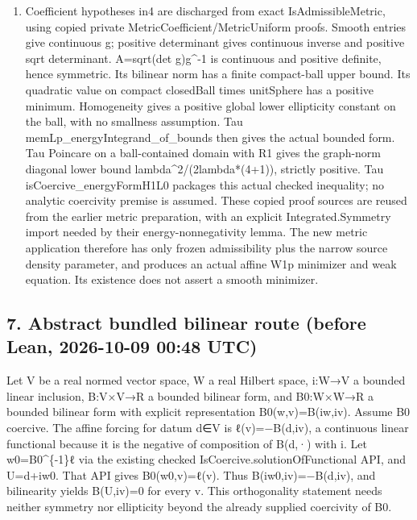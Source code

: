 \documentclass[11pt]{article}
\theoremstyle{definition}
\theoremstyle{remark}
\numberwithin{equation}{section}
\providecommand{\tightlist}{}
\begin{document}
\begin{enumerate}
\def\labelenumi{\arabic{enumi}.}
\setcounter{enumi}{5}
\tightlist
\item
  Coefficient hypotheses in4 are discharged from exact
  IsAdmissibleMetric, using copied private
  MetricCoefficient/MetricUniform proofs. Smooth entries give continuous
  g; positive determinant gives continuous inverse and positive sqrt
  determinant. A=sqrt(det g)g\^{}-1 is continuous and positive definite,
  hence symmetric. Its bilinear norm has a finite compact-ball upper
  bound. Its quadratic value on compact closedBall times unitSphere has
  a positive minimum. Homogeneity gives a positive global lower
  ellipticity constant on the ball, with no smallness assumption. Tau
  memLp\_energyIntegrand\_of\_bounds then gives the actual bounded form.
  Tau Poincare on a ball-contained domain with R1 gives the graph-norm
  diagonal lower bound lambda\^{}2/(2lambda*(4+1)), strictly positive.
  Tau isCoercive\_energyFormH1L0 packages this actual checked
  inequality; no analytic coercivity premise is assumed. These copied
  proof sources are reused from the earlier metric preparation, with an
  explicit Integrated.Symmetry import needed by their
  energy-nonnegativity lemma. The new metric application therefore has
  only frozen admissibility plus the narrow source density parameter,
  and produces an actual affine W1p minimizer and weak equation. Its
  existence does not assert a smooth minimizer.
\end{enumerate}

\hypertarget{source-1efa4a952efe-abstract-bundled-bilinear-route-before-lean-2026-10-09-0048-utc}{%
\subsection{7. Abstract bundled bilinear route (before Lean, 2026-10-09
00:48
UTC)}\label{source-1efa4a952efe-abstract-bundled-bilinear-route-before-lean-2026-10-09-0048-utc}}

Let V be a real normed vector space, W a real Hilbert space, i:W→V a
bounded linear inclusion, B:V×V→R a bounded bilinear form, and B0:W×W→R
a bounded bilinear form with explicit representation B0(w,v)=B(iw,iv).
Assume B0 coercive. The affine forcing for datum d∈V is ℓ(v)=−B(d,iv), a
continuous linear functional because it is the negative of composition
of B(d,·) with i. Let w0=B0\^{}\{-1\}ℓ via the existing checked
IsCoercive.solutionOfFunctional API, and U=d+iw0. That API gives
B0(w0,v)=ℓ(v). Thus B(iw0,iv)=−B(d,iv), and bilinearity yields B(U,iv)=0
for every v. This orthogonality statement needs neither symmetry nor
ellipticity beyond the already supplied coercivity of B0.
\end{document}
